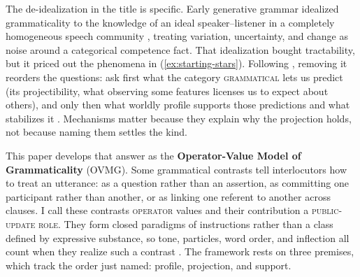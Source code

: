 \documentclass[12pt,letterpaper]{article}
\newcommand{\term}[1]{\textsc{#1}}
\begin{document}
The de-idealization in the title is specific. Early generative grammar idealized grammaticality to the knowledge of an ideal speaker--listener in a completely homogeneous speech community \autocite[3]{chomsky1965}, treating variation, uncertainty, and change as noise around a categorical competence fact. That idealization bought tractability, but it priced out the phenomena in (\ref{ex:starting-stars}). Following \textcite{Goodman1955}, removing it reorders the questions: ask first what the category \term{grammatical} lets us predict (its projectibility, what observing some features licenses us to expect about others), and only then what worldly profile supports those predictions and what stabilizes it \autocite{boyd1999, millikan1999, khalidi2013, khalidi2018nodes, slater2015, reynolds2026kindsProjectibilityProfiles}. Mechanisms matter because they explain why the projection holds, not because naming them settles the kind.

This paper develops that answer as the \textbf{Operator-Value Model of Grammaticality} (OVMG). Some grammatical contrasts tell interlocutors how to treat an utterance: as a question rather than an assertion, as committing one participant rather than another, or as linking one referent to another across clauses. I call these contrasts \term{operator} values and their contribution a \term{public-update role}. They form closed paradigms of instructions rather than a class defined by expressive substance, so tone, particles, word order, and inflection all count when they realize such a contrast \autocite{reynolds2026operators}. The framework rests on three premises, which track the order just named: profile, projection, and support.
\end{document}
